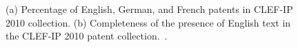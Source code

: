 \begin{figure}[t!]
\begin{centering}
\par\end{centering}

\begin{centering}
\par\end{centering}

\protect\caption{(a) Percentage of English, German, and French patents in CLEF-IP 2010 collection.
                 (b) Completeness of the presence of English text in the CLEF-IP 2010 patent collection.~\citep{magdy2012toward}.}
\label{fig:lang}
\end{figure}
